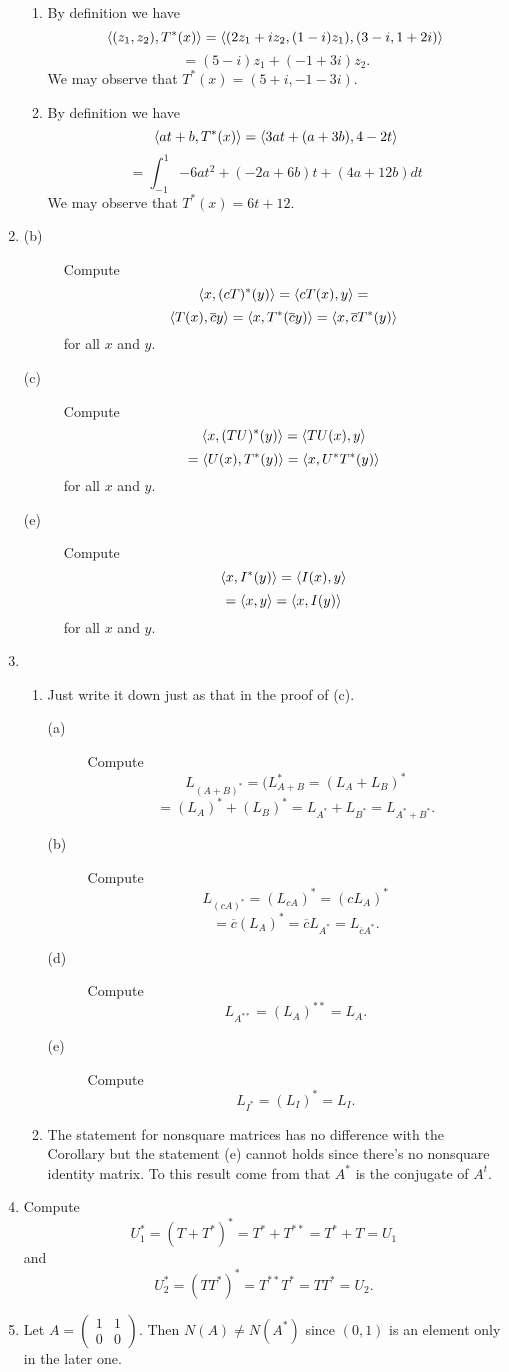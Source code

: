 \begin{enumerate}
\begin{enumerate}
\item By definition we have 
\[\langle (z_1,z_2),T^*(x)\rangle =\langle (2z_1+iz_2,(1-i)z_1),(3-i,1+2i)\rangle \]
\[=(5-i)z_1+(-1+3i)z_2.\]
We may observe that $T^*(x)=(5+i,-1-3i)$.
\item By definition we have 
\[\langle at+b,T^*(x)\rangle =\langle 3at+(a+3b),4-2t\rangle \]
\[=\int_{-1}^1{-6at^2+(-2a+6b)t+(4a+12b)dt}\]
We may observe that $T^*(x)=6t+12$.
\end{enumerate}
\item \begin{description}
\item[(b)] Compute 
\[\langle x,(cT)^*(y)\rangle =\langle cT(x),y\rangle =\]
\[\langle T(x),\overline{c}y\rangle =\langle x,T^*(\overline{c}y)\rangle =\langle x,\overline{c}T^*(y)\rangle \]
for all $x$ and $y$.
\item[(c)] Compute 
\[\langle x,(TU)^*(y)\rangle =\langle TU(x),y\rangle \]
\[=\langle U(x),T^*(y)\rangle =\langle x,U^*T^*(y)\rangle \]
for all $x$ and $y$.
\item[(e)] Compute 
\[\langle x,I^*(y)\rangle =\langle I(x),y\rangle \]
\[=\langle x,y\rangle =\langle x,I(y)\rangle \]
for all $x$ and $y$.
\end{description}
\item \begin{enumerate}
\item Just write it down just as that in the proof of (c).
\begin{description}
\item[(a)] Compute 
\[L_{(A+B)^*}=(L_{A+B}^*=(L_A+L_B)^*\]
\[=(L_A)^*+(L_B)^*=L_{A^*}+L_{B^*}=L_{A^*+B^*}.\]
\item[(b)] Compute 
\[L_{(cA)^*}=(L_{cA})^*=(cL_A)^*\]
\[=\overline{c}(L_A)^*=\overline{c}L_{A^*}=L_{\overline{c}A^*}.\]
\item[(d)] Compute 
\[L_{A^{**}}=(L_A)^{**}=L_A.\]
\item[(e)] Compute 
\[L_{I^*}=(L_I)^*=L_I.\]
\end{description}
\item The statement for nonsquare matrices has no difference with the Corollary but the statement (e) cannot holds since there's no nonsquare identity matrix. To this result come from that $A^*$ is the conjugate of $A^t$.
\end{enumerate}
\item Compute 
\[U_1^*=(T+T^*)^*=T^*+T^{**}=T^*+T=U_1\]
and 
\[U_2^*=(TT^*)^*=T^{**}T^*=TT^*=U_2.\]
\item Let $A=\begin{pmatrix}1&1\\0&0\end{pmatrix}$. Then $N(A)\neq N(A^*)$ since $(0,1)$ is an element only in the later one.

\end{enumerate}
